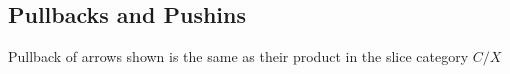 \documentclass[../../notes.tex]{subfiles}
\begin{document}
\subsection{Pullbacks and Pushins}


Pullback of arrows shown is the same as their product in the slice category $C/X$
\end{document}

